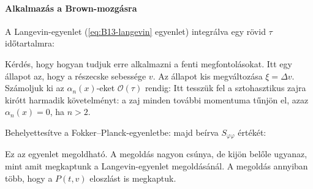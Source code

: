    
  \paragraph{Alkalmazás a Brown-mozgásra}
   
   A Langevin-egyenlet (\eqref{eq:B13-langevin} egyenlet) integrálva egy rövid $\tau$ időtartalmra:
   
   Kérdés, hogy hogyan tudjuk erre alkalmazni a fenti megfontolásokat. Itt egy állapot az, hogy a részecske sebessége $v$. Az állapot kis megváltozása $\xi=\Delta v$. Számoljuk ki az $\alpha_n(x)$-eket $\mathcal{O}(\tau)$ rendig:
   Itt tesszük fel a sztohasztikus zajra kirótt harmadik követelményt: a zaj minden további momentuma tűnjön el, azaz $\alpha_n(x)=0$, ha $n>2$. 
   
   Behelyettesítve a Fokker--Planck-egyenletbe:
   majd beírva $S_{\varphi\varphi}$ értékét:
   
   Ez az egyenlet megoldható. A megoldás nagyon csúnya, de kijön belőle ugyanaz, mint amit megkaptunk a Langevin-egyenlet megoldásánál. A megoldás annyiban több, hogy a $P(t,v)$ eloszlást is megkaptuk.
   
